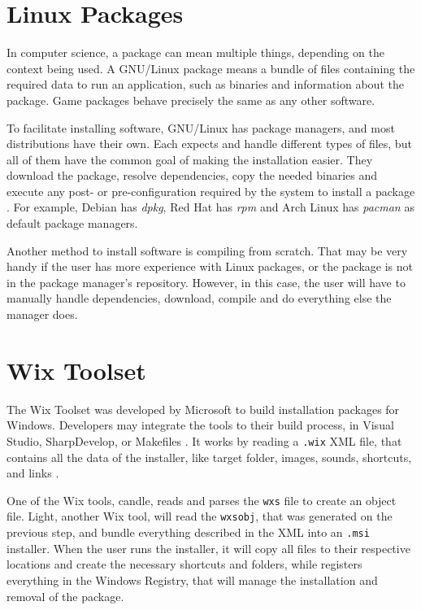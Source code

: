 \section{Linux Packages}
\label {sec:packages}

In computer science, a package can mean multiple things, depending on the context being used. A GNU/Linux package means a bundle of files containing the required data to run an application, such as binaries and information about the package. Game packages behave precisely the same as any other software.

To facilitate installing software, GNU/Linux has package managers, and most distributions have their own. Each expects and handle different types of files, but all of them have the common goal of making the installation easier. They download the package, resolve dependencies, copy the needed binaries and execute any post- or pre-configuration required by the system to install a package \cite{linode2017linux}. For example, Debian has \textit{dpkg}, Red Hat has \textit{rpm} and Arch Linux has \textit{pacman} as default package managers.

Another method to install software is compiling from scratch. That may be very handy if the user has more experience with Linux packages, or the package is not in the package manager's repository. However, in this case, the user will have to manually handle dependencies, download, compile and do everything else the manager does.


\section{Wix Toolset}
\label{sec:wix_toolset}

The Wix Toolset was developed by Microsoft to build installation packages for Windows. Developers may integrate the tools to their build process, in Visual Studio, SharpDevelop, or Makefiles \cite{firegiant2017tutorial}. It works by reading a \texttt{.wix} XML file, that contains all the data of the installer, like target folder, images, sounds, shortcuts, and links \cite{wix2017wikipedia}.

One of the Wix tools, candle, reads and parses the \texttt{wxs} file to create an object file. Light, another Wix tool, will read the \texttt{wxsobj}, that was generated on the previous step, and bundle everything described in the XML into an \texttt{.msi} installer. When the user runs the installer, it will copy all files to their respective locations and create the necessary shortcuts and folders, while registers everything in the Windows Registry, that will manage the installation and removal of the package.

